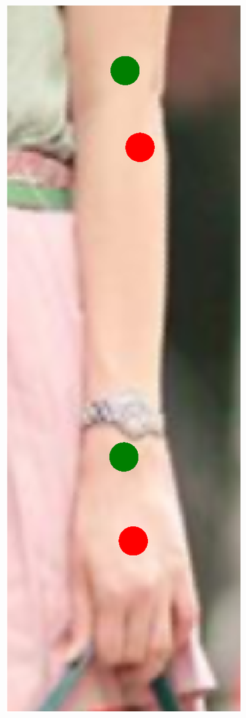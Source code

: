 \begin{figure}[!t]
    \includegraphics[height=\fh]{resources/Fixing/fix_12}
    \hfill

\end{figure}
